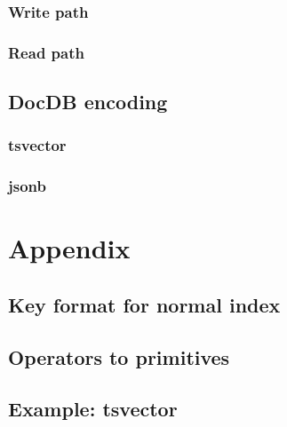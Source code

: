 \documentclass[11pt]{article}
\begin{document}
\hypertarget{write-path}{%
\subsubsection{Write path}\label{write-path}}


\hypertarget{read-path}{%
\subsubsection{Read path}\label{read-path}}


\hypertarget{docdb-encoding}{%
\subsection{DocDB encoding}\label{docdb-encoding}}


\hypertarget{tsvector}{%
\subsubsection{tsvector}\label{tsvector}}


\hypertarget{jsonb}{%
\subsubsection{jsonb}\label{jsonb}}


\newpage
\hypertarget{appendix}{%
\section{Appendix}\label{appendix}}

\hypertarget{key-format-for-normal-index}{%
\subsection{Key format for normal index}\label{key-format-for-normal-index}}


\hypertarget{operators-to-primitives}{%
\subsection{Operators to primitives}\label{operators-to-primitives}}


\hypertarget{example-tsvector}{%
\subsection{Example: tsvector}\label{example-tsvector}}

\end{document}
